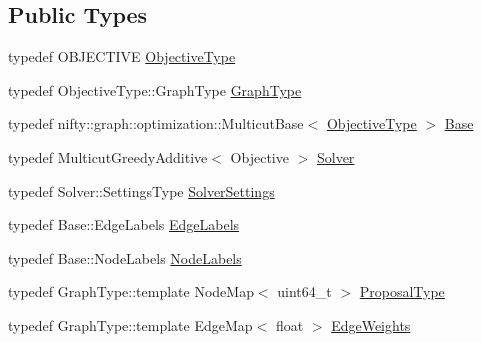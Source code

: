 \subsection*{Public Types}
\begin{DoxyCompactItemize}
\item 
typedef O\+B\+J\+E\+C\+T\+I\+V\+E \hyperlink{classnifty_1_1graph_1_1optimization_1_1common_1_1GreedyAdditiveMulticutProposals_a82ebea313ce98149a4ac7003b792d6fe}{Objective\+Type}
\item 
typedef Objective\+Type\+::\+Graph\+Type \hyperlink{classnifty_1_1graph_1_1optimization_1_1common_1_1GreedyAdditiveMulticutProposals_a7e395c2bc3f18b9df2167e99f43e73f5}{Graph\+Type}
\item 
typedef nifty\+::graph\+::optimization\+::\+Multicut\+Base$<$ \hyperlink{classnifty_1_1graph_1_1optimization_1_1common_1_1GreedyAdditiveMulticutProposals_a82ebea313ce98149a4ac7003b792d6fe}{Objective\+Type} $>$ \hyperlink{classnifty_1_1graph_1_1optimization_1_1common_1_1GreedyAdditiveMulticutProposals_a903eacc5a19cb47916995019e4db2e0e}{Base}
\item 
typedef Multicut\+Greedy\+Additive$<$ Objective $>$ \hyperlink{classnifty_1_1graph_1_1optimization_1_1common_1_1GreedyAdditiveMulticutProposals_a87b47b0b53217d644e7a171b1dd3bfdf}{Solver}
\item 
typedef Solver\+::\+Settings\+Type \hyperlink{classnifty_1_1graph_1_1optimization_1_1common_1_1GreedyAdditiveMulticutProposals_a621d7ba4cccdd69804768b0b12184c17}{Solver\+Settings}
\item 
typedef Base\+::\+Edge\+Labels \hyperlink{classnifty_1_1graph_1_1optimization_1_1common_1_1GreedyAdditiveMulticutProposals_aaee332dfc9ee0e30897cbc1e37a6cff0}{Edge\+Labels}
\item 
typedef Base\+::\+Node\+Labels \hyperlink{classnifty_1_1graph_1_1optimization_1_1common_1_1GreedyAdditiveMulticutProposals_af59b25bf72b3164494b942fbf514f9c8}{Node\+Labels}
\item 
typedef Graph\+Type\+::template Node\+Map$<$ uint64\+\_\+t $>$ \hyperlink{classnifty_1_1graph_1_1optimization_1_1common_1_1GreedyAdditiveMulticutProposals_a2344bbd2084e7c62a179e6f0ce2d11f8}{Proposal\+Type}
\item 
typedef Graph\+Type\+::template Edge\+Map$<$ float $>$ \hyperlink{classnifty_1_1graph_1_1optimization_1_1common_1_1GreedyAdditiveMulticutProposals_a6709922efafd758e0f52169ff073d250}{Edge\+Weights}
\end{DoxyCompactItemize}
